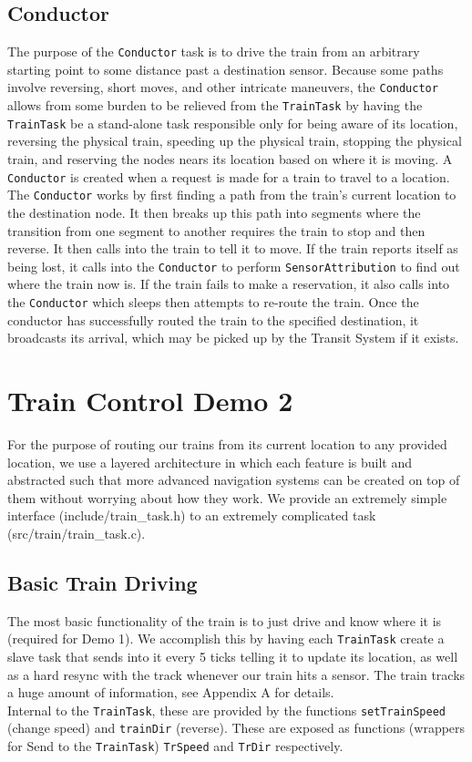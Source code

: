 \documentclass[12pt]{article}
\begin{document}
\subsection{Conductor}
The purpose of the \texttt{Conductor} task is to drive the train from an arbitrary starting point to some distance past a destination sensor.  Because some paths involve reversing, short moves, and other intricate maneuvers, the \texttt{Conductor} allows from some burden to be relieved from the \texttt{TrainTask} by having the \texttt{TrainTask} be a stand-alone task responsible only for being aware of its location, reversing the physical train, speeding up the physical train, stopping the physical train, and reserving the nodes nears its location based on where it is moving.  A \texttt{Conductor} is created when a request is made for a train to travel to a location.  The \texttt{Conductor} works by first finding a path from the train's current location to the destination node.  It then breaks up this path into segments where the transition from one segment to another requires the train to stop and then reverse.  It then calls into the train to tell it to move.  If the train reports itself as being lost, it calls into the \texttt{Conductor} to perform \texttt{SensorAttribution} to find out where the train now is.  If the train fails to make a reservation, it also calls into the \texttt{Conductor} which sleeps then attempts to re-route the train.  Once the conductor has successfully routed the train to the specified destination, it broadcasts its arrival, which may be picked up by the Transit System if it exists.
\\[2\baselineskip]
\section{Train Control Demo 2}
For the purpose of routing our trains from its current location to any provided location, we use a layered architecture
in which each feature is built and abstracted such that more advanced navigation systems can be created on top of them
without worrying about how they work. We provide an extremely simple interface (include/train\_task.h) to an extremely
complicated task (src/train/train\_task.c).
\\[1\baselineskip]
\subsection{Basic Train Driving}
The most basic functionality of the train is to just drive and know where it is (required for Demo 1). We accomplish
this by having each \texttt{TrainTask} create a slave task that sends into it every 5 ticks telling it to update its
location, as well as a hard resync with the track whenever our train hits a sensor. The train tracks a huge amount of
information, see Appendix A for details.
\\
Internal to the \texttt{TrainTask}, these are provided by the functions \texttt{setTrainSpeed} (change speed) and
\texttt{trainDir} (reverse). These are exposed as functions (wrappers for Send to the \texttt{TrainTask})
\texttt{TrSpeed} and \texttt{TrDir} respectively.
\\[1\baselineskip]
\end{document}
